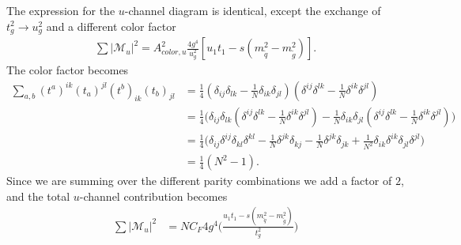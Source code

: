 \documentclass[11pt]{article}
\begin{document}
\begin{flushleft}
The expression for the $u$-channel diagram is identical, except the exchange of $t_g^2 \rightarrow u_g^2$ and a different color factor
\begin{align*}
\sum |\mathcal{M}_u|^2 = A^2_{color, u} \frac{4 g^4}{u_g^2} [u_1 t_1 - s(m_{\tilde{q}}^2 - m_{\tilde{g}}^2)]. 
\end{align*}
The color factor becomes
\begin{align*}
\sum_{a,b}(t^a)^{ik}(t_a)^{jl}(t^b)_{ik}(t_b)_{jl} &= \frac{1}{4}(\delta_{ij}\delta_{lk}-\frac{1}{N}\delta_{ik}\delta_{jl})(\delta^{ij}\delta^{lk}-\frac{1}{N}\delta^{ik}\delta^{jl})\\
&= \frac{1}{4} \big(\delta_{ij}\delta_{lk}(\delta^{ij}\delta^{lk}-\frac{1}{N}\delta^{ik}\delta^{jl}) -\frac{1}{N}\delta_{ik}\delta_{jl}(\delta^{ij}\delta^{lk}-\frac{1}{N}\delta^{ik}\delta^{jl}) \big)\\
&= \frac{1}{4} \big(\delta_{ij}\delta^{ij} \delta_{kl} \delta^{kl} - \frac{1}{N} \delta^{jk}\delta_{kj} - \frac{1}{N} \delta^{jk}\delta_{jk} + \frac{1}{N^2} \delta_{ik} \delta^{ik} \delta_{jl} \delta^{jl} \big)\\
&= \frac{1}{4} (N^2-1).
\end{align*}
Since we are summing over the different parity combinations we add a factor of $2$, and the total $u$-channel contribution becomes
\begin{align*}
\sum |\mathcal{M}_u|^2 &= NC_F 4g^4 \Big( \frac{u_1 t_1 - s(m_{\tilde{q}}^2 - m_{\tilde{g}}^2)}{t_g^2} \Big)
\end{align*}
\end{flushleft}
\end{document}
